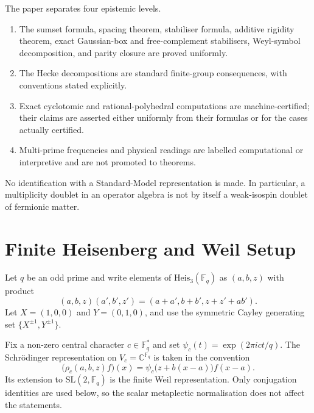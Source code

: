 \documentclass[11pt,a4paper]{article}
\theoremstyle{definition}
\theoremstyle{remark}
\newcommand{\C}{\mathbb{C}}
\newcommand{\Fq}{\mathbb{F}_q}
\newcommand{\G}{\mathrm{SL}(2,\Fq)}
\newcommand{\Heis}{\mathrm{Heis}_3(\Fq)}
\begin{document}
The paper separates four epistemic levels.

\begin{enumerate}[label=(\roman*)]
  \item The sumset formula, spacing theorem, stabiliser formula, additive rigidity theorem,
  exact Gaussian-box and free-complement stabilisers, Weyl-symbol decomposition, and
  parity closure are proved uniformly.
  \item The Hecke decompositions are standard finite-group consequences, with conventions
  stated explicitly.
  \item Exact cyclotomic and rational-polyhedral computations are machine-certified;
  their claims are asserted either uniformly from their formulas or for the cases actually
  certified.
  \item Multi-prime frequencies and physical readings are labelled computational or
  interpretive and are not promoted to theorems.
\end{enumerate}

No identification with a Standard-Model representation is made.
In particular, a multiplicity doublet in an operator algebra is not by itself a weak-isospin
doublet of fermionic matter.

\section{Finite Heisenberg and Weil Setup}
\label{sec:setup}

Let $q$ be an odd prime and write elements of $\Heis$ as $(a,b,z)$ with product
\begin{equation}
  (a,b,z)(a',b',z')=(a+a',b+b',z+z'+ab').
  \label{eq:heisenberg-product}
\end{equation}
Let $X=(1,0,0)$ and $Y=(0,1,0)$, and use the symmetric Cayley generating set
$\{X^{\pm1},Y^{\pm1}\}$.

Fix a non-zero central character $c\in\Fq^*$ and set
$\psi_c(t)=\exp(2\pi i ct/q)$.
The Schr\"odinger representation on $V_c=\C^{\Fq}$ is taken in the convention
\begin{equation}
  \bigl(\rho_c(a,b,z)f\bigr)(x)=\psi_c\!\bigl(z+b(x-a)\bigr)f(x-a).
  \label{eq:schrodinger}
\end{equation}
Its extension to $\G$ is the finite Weil representation.
Only conjugation identities are used below, so the scalar metaplectic normalisation does not
affect the statements.
\end{document}
